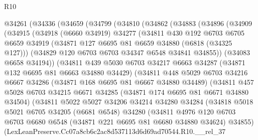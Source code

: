 \begin{lexlean}{R10}
\begin{coremodule}
  @34261
    (@34336
      (@34659
        (@34799
          (@34810
            (@34862
              (@34883
                (@34896
                  (@34909
                    (@34915
                      (@34918
                        (@6660 @34919)
                        @34277
                        (@34811
                          @430
                          @192
                          @6703
                          @6705
                          @6659
                          @34919
                          (@34871 @127 @6695 @81 @6659 @34880 (@6818 (@34325 @127)))
                          (@34829 @120 @6703 @6703 @34347 @6548 @34841 @34855))
                        (@34083 @6658 @34194))
                      (@34811
                        @439
                        @5030
                        @6703
                        @34217
                        @6663
                        @34287
                        (@34871 @132 @6695 @81 @6663 @34880 @34429)
                        (@34811
                          @448
                          @5029
                          @6703
                          @34216
                          @6667
                          @34286
                          (@34871 @168 @6695 @81 @6667 @34880 @34489)
                          (@34811
                            @457
                            @5028
                            @6703
                            @34215
                            @6671
                            @34285
                            (@34871 @174 @6695 @81 @6671 @34880 @34504)
                            (@34811
                              @5022
                              @5027
                              @34206
                              @34214
                              @34280
                              @34284
                              (@34818
                                @5018
                                @5021
                                @6705
                                @34205
                                (@6681 @6548)
                                @34280
                                (@34811
                                  @4976
                                  @120
                                  @6703
                                  @6703
                                  @6680
                                  @6548
                                  (@34871 @221 @6695 @81 @6680 @34880 @34624)
                                  @34855)
                                (LexLeanPreserve.Cc07a8cb6c2ac8d537113d6d69ad70544.R10.__rel_37

\end{coremodule}
\end{lexlean}
